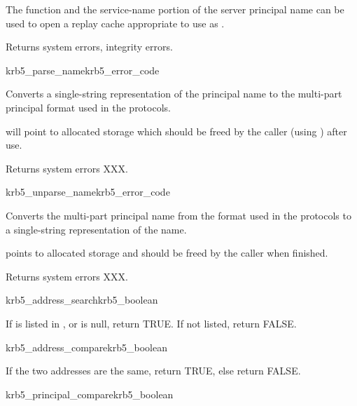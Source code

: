 The function  and the service-name
portion of the server principal name can be used to open a
replay cache appropriate to use as .

Returns system errors, integrity errors.

\begin{funcdecl}{krb5_parse_name}{krb5_error_code}{\funcin}
\funcout
{}
\end{funcdecl}

Converts a single-string representation  of the
principal name to the multi-part principal format used in the protocols.

 will point to allocated storage which should be freed by
the caller (using ) after use.

Returns system errors XXX.

\begin{funcdecl}{krb5_unparse_name}{krb5_error_code}{\funcin}
\funcout
{}
\end{funcdecl}

Converts the multi-part principal name  from the
format used in the protocols to a single-string representation of the name.

 points to allocated storage and should be freed by the caller
when finished.

Returns system errors XXX.

\begin{funcdecl}{krb5_address_search}{krb5_boolean}{\funcin}
\end{funcdecl}

If  is listed in , or
 is null, return TRUE.  If not listed, return FALSE.

\begin{funcdecl}{krb5_address_compare}{krb5_boolean}{\funcin}
\end{funcdecl}

If the two addresses are the same, return TRUE, else return FALSE.

\begin{funcdecl}{krb5_principal_compare}{krb5_boolean}{\funcin}
\end{funcdecl}


